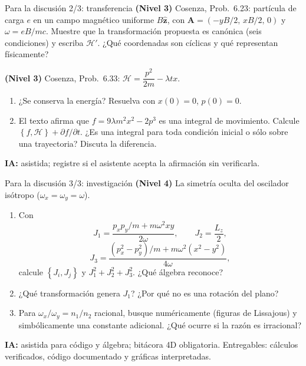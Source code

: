 \documentclass[spanish]{beamer}
\newcommand{\Ham}{\mathcal{H}}
\newcommand{\pb}[2]{\left\{#1,#2\right\}}   %
\begin{document}
\begin{frame}{Para la discusión 2/3: transferencia}
\textbf{(Nivel 3)} Cosenza, Prob.~6.23: partícula de carga $e$ en un campo magnético
uniforme $B\hat{\mathbf z}$, con $\mathbf A = (-yB/2,\, xB/2,\, 0)$ y $\omega = eB/mc$.
Muestre que la transformación propuesta es canónica (seis condiciones) y escriba
$\Ham'$. ¿Qué coordenadas son cíclicas y qué representan físicamente?
\vspace{0.2cm}

\textbf{(Nivel 3)} Cosenza, Prob.~6.33: $\Ham = \dfrac{p^2}{2m} - \lambda t x$.
\begin{enumerate}
  \item ¿Se conserva la energía? Resuelva con $x(0) = 0$, $p(0) = 0$.
  \item El texto afirma que $f = 9\lambda m^2x^2 - 2p^3$ es una integral de movimiento.
        Calcule $\pb{f}{\Ham} + \partial f/\partial t$. ¿Es una integral para toda
        condición inicial o sólo sobre una trayectoria? Discuta la diferencia.
\end{enumerate}
\textbf{IA:} asistida; registre si el asistente acepta la afirmación sin verificarla.
\end{frame}

\begin{frame}{Para la discusión 3/3: investigación}
\textbf{(Nivel 4)} La simetría oculta del oscilador isótropo ($\omega_x = \omega_y = \omega$).
\begin{enumerate}
  \item Con
  \[
    J_1 = \frac{p_xp_y/m + m\omega^2xy}{2\omega},\qquad J_2 = \frac{L_z}{2},
  \]
  \[
    J_3 = \frac{(p_x^2-p_y^2)/m + m\omega^2(x^2-y^2)}{4\omega},
  \]
  calcule $\pb{J_i}{J_j}$ y $J_1^2 + J_2^2 + J_3^2$. ¿Qué álgebra reconoce?
  \item ¿Qué transformación genera $J_1$? ¿Por qué no es una rotación del plano?
  \item Para $\omega_x/\omega_y = n_1/n_2$ racional, busque numéricamente
        (figuras de Lissajous) y simbólicamente una constante adicional.
        ¿Qué ocurre si la razón es irracional?
\end{enumerate}
\textbf{IA:} asistida para código y álgebra; bitácora 4D obligatoria.
Entregables: cálculos verificados, código documentado y gráficas interpretadas.
\end{frame}
\end{document}
